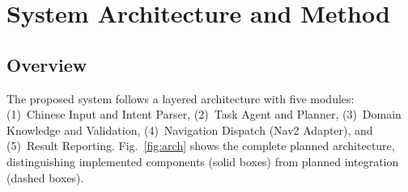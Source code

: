 \documentclass[conference]{IEEEtran}
\begin{document}
\section{System Architecture and Method}

\subsection{Overview}

The proposed system follows a layered architecture with five modules:
(1)~Chinese Input and Intent Parser,
(2)~Task Agent and Planner,
(3)~Domain Knowledge and Validation,
(4)~Navigation Dispatch (Nav2 Adapter), and
(5)~Result Reporting.
Fig.~\ref{fig:arch} shows the complete planned architecture, distinguishing
implemented components (solid boxes) from planned integration (dashed boxes).
\end{document}
